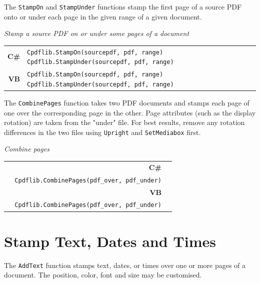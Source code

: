 \documentclass[a4paper]{memoir}
\begin{document}
The \verb!StampOn! and \verb!StampUnder! functions stamp the first page of a source PDF onto or under each page in the given range of a given document.
\begin{framed}
\noindent\textit{Stamp a source PDF on or under some pages of a document}

\vspace{2mm}
\noindent\begin{tabular}{rl}
\small\sffamily\textbf{C\#} &
\begin{minipage}{4in}
\small\verb!Cpdflib.StampOn(sourcepdf, pdf, range)!
\small\verb!Cpdflib.StampUnder(sourcepdf, pdf, range)!
\end{minipage}\\[5mm]
\small\sffamily\textbf{VB} &
\begin{minipage}{4in}
\small\verb!Cpdflib.StampOn(sourcepdf, pdf, range)!
\small\verb!Cpdflib.StampUnder(sourcepdf, pdf, range)!
\end{minipage}\\[5mm]
\end{tabular}
\end{framed}

The \verb!CombinePages! function takes two PDF documents and stamps each page of one over the corresponding page in the other. Page attributes (such as the display rotation) are taken from the "under" file. For best results, remove any rotation differences in the two files using \verb!Upright! and \verb!SetMediabox! first.
\begin{framed}
\noindent\textit{Combine pages}

\vspace{2mm}
\noindent\begin{tabular}{rl}
\small\sffamily\textbf{C\#} &
\begin{minipage}{4in}
\small\verb!Pdf.pdfdoc result =!\\
\small\verb!  Cpdflib.CombinePages(pdf_over, pdf_under)!
\end{minipage}\\[5mm]
\small\sffamily\textbf{VB} &
\begin{minipage}{4in}
\small\verb!Dim result As Pdf.pdfdoc =!\\
\small\verb!  Cpdflib.CombinePages(pdf_over, pdf_under)!
\end{minipage}\\[5mm]
\end{tabular}
\end{framed}

\section{Stamp Text, Dates and Times}
The \verb!AddText! function stamps text, dates, or times over one or more pages of a document. The position, color, font and size may be customised.
\end{document}
